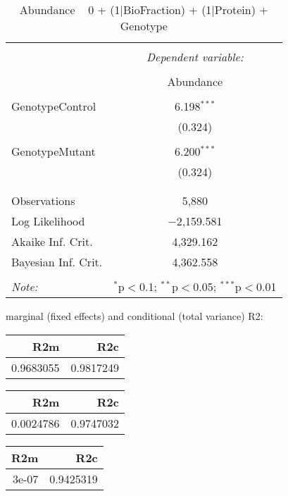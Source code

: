 \documentclass[11pt]{report}
\begin{document}
\begin{table}[!htbp] \centering 
  \caption{Abundance ~ 0 + (1|BioFraction) + (1|Protein) + Genotype} 
  \label{} 
\begin{tabular}{@{\extracolsep{5pt}}lc} 
\\[-1.8ex]\hline 
\hline \\[-1.8ex] 
 & \multicolumn{1}{c}{\textit{Dependent variable:}} \\ 
\cline{2-2} 
\\[-1.8ex] & Abundance \\ 
\hline \\[-1.8ex] 
 GenotypeControl & 6.198$^{***}$ \\ 
  & (0.324) \\ 
  & \\ 
 GenotypeMutant & 6.200$^{***}$ \\ 
  & (0.324) \\ 
  & \\ 
\hline \\[-1.8ex] 
Observations & 5,880 \\ 
Log Likelihood & $-$2,159.581 \\ 
Akaike Inf. Crit. & 4,329.162 \\ 
Bayesian Inf. Crit. & 4,362.558 \\ 
\hline 
\hline \\[-1.8ex] 
\textit{Note:}  & \multicolumn{1}{r}{$^{*}$p$<$0.1; $^{**}$p$<$0.05; $^{***}$p$<$0.01} \\ 
\end{tabular} 
\end{table} 
marginal (fixed effects) and conditional (total variance) R2:

\begin{tabular}{r|r}
\hline
R2m & R2c\\
\hline
0.9683055 & 0.9817249\\
\hline
\end{tabular}

\begin{tabular}{r|r}
\hline
R2m & R2c\\
\hline
0.0024786 & 0.9747032\\
\hline
\end{tabular}

\begin{tabular}{r|r}
\hline
R2m & R2c\\
\hline
3e-07 & 0.9425319\\
\hline
\end{tabular}
\end{document}
